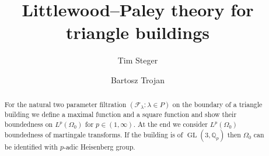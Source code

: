 \documentclass[a4paper]{amsart}
\newcommand{\GL}{\operatorname{GL}}
\newcommand{\seq}[2]{\left({#1}: {#2}\right)}
\newcommand{\QQ}{\mathbb{Q}}
\newcommand{\pl}[1]{\foreignlanguage{polish}{#1}}
\theoremstyle{plain}
\theoremstyle{definition}
\theoremstyle{remark}
\numberwithin{equation}{section}
\theoremstyle{plain}
\begin{document}

\title[Littlewood--Paley theory for buildings]
	{Littlewood--Paley theory for triangle buildings}

\author{Tim Steger}
\address{Tim Steger\\
		 Matematica\\
		 Universit\`a degli Studi di Sassari\\
		 Via Piandanna 4\\
		 07100 Sassari\\
		 Italy}

\author{Bartosz Trojan}
\address{
        \pl{
        Bartosz Trojan\\
        Wydzia\l{} Matematyki,
        Politechnika Wroc\l{}awska\\
        Wyb. Wyspia\'{n}skiego 27\\
        50-370 Wroc\l{}aw\\
        Poland}
}

\begin{abstract}
For the natural two parameter filtration
$\seq{\mathcal{F}_\lambda}{\lambda \in P}$ on the boundary of a
triangle building we define a maximal function and a square function
and show their boundedness on $L^p(\Omega_0)$ for $p \in (1, \infty)$.
At the end we consider $L^p(\Omega_0)$ boundedness of martingale
transforms. If the building is of $\GL(3, \QQ_p)$ then $\Omega_0$ can be
identified with $p$-adic Heisenberg group.
\end{abstract}



\maketitle
\end{document}
